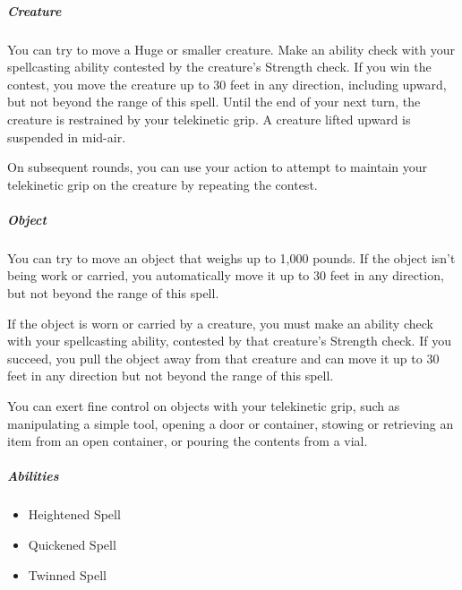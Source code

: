 \documentclass[a4paper,openany,twocolumn]{book}
\begin{document}
\subparagraph*{Creature} You can try to move a Huge or smaller creature. Make an ability check with your spellcasting ability contested by the creature's Strength check. If you win the contest, you move the creature up to 30 feet in any direction, including upward, but not beyond the range of this spell. Until the end of your next turn, the creature is restrained by your telekinetic grip. A creature lifted upward is suspended in mid-air.

On subsequent rounds, you can use your action to attempt to maintain your telekinetic grip on the creature by repeating the contest.

\subparagraph*{Object} You can try to move an object that weighs up to 1,000 pounds. If the object isn't being work or carried, you automatically move it up to 30 feet in any direction, but not beyond the range of this spell.

If the object is worn or carried by a creature, you must make an ability check with your spellcasting ability, contested by that creature's Strength check. If you succeed, you pull the object away from that creature and can move it up to 30 feet in any direction but not beyond the range of this spell.

You can exert fine control on objects with your telekinetic grip, such as manipulating a simple tool, opening a door or container, stowing or retrieving an item from an open container, or pouring the contents from a vial.

\subparagraph*{Abilities}
\begin{itemize}
  \item Heightened Spell
  \item Quickened Spell
  \item Twinned Spell
\end{itemize}
\end{document}
